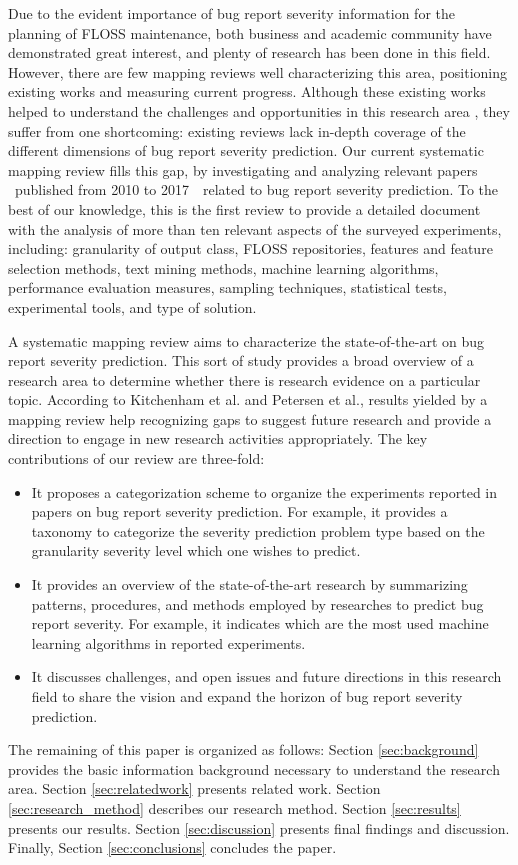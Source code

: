 Due to the evident importance of bug report severity information for the planning of FLOSS maintenance, both business and academic community have demonstrated great interest, and plenty of research has been done in this field. However, there are few mapping reviews well characterizing this area, positioning existing works and measuring current progress. Although these existing works helped to understand the challenges and opportunities in this research area \cite{Cavalcanti:2014, Uddin:2017}, they suffer from one shortcoming:  existing reviews lack in-depth coverage of the different dimensions of bug report severity prediction. Our current systematic mapping review fills this gap, by investigating and analyzing relevant papers \textemdash~published from 2010 to 2017~\textemdash~related to bug report severity prediction. To the best of our knowledge, this is the first review to provide a detailed document with the analysis of more than ten relevant aspects of the surveyed experiments, including: granularity of output class, FLOSS repositories, features and feature selection methods, text mining methods, machine learning algorithms, performance evaluation measures, sampling techniques, statistical tests,  experimental tools, and type of solution. 

A systematic mapping review aims to characterize the state-of-the-art on bug report severity prediction. This sort of study provides a broad overview of a research area to determine whether there is research evidence on a particular topic. According to Kitchenham et al.\cite{Kitchenham:2007} and Petersen et al.\cite{Petersen:2008}, results yielded by a mapping review help recognizing gaps to suggest future research and provide a direction to engage in new research activities appropriately. The key contributions of our review are three-fold: 

\begin{itemize}
  \item It proposes a categorization scheme to organize the experiments reported in papers on bug report severity prediction. For example, it provides a taxonomy to categorize the severity prediction problem type based on the granularity severity level which one wishes to predict.
  \item It provides an overview of the state-of-the-art research by summarizing patterns, procedures, and methods employed by researches to predict bug report severity. For example, it indicates which are the most used machine learning algorithms in reported experiments.
  \item It discusses challenges, and open issues and future directions in this research field to share the vision and expand the horizon of bug report severity prediction. 
\end{itemize}

The remaining of this paper is organized as follows: Section \ref{sec:background} provides the basic information background necessary to understand the research area. Section \ref{sec:relatedwork} presents related work. Section \ref{sec:research_method} describes our research method. Section \ref{sec:results} presents our results. Section \ref{sec:discussion} presents final findings and discussion. Finally, Section \ref{sec:conclusions} concludes the paper.